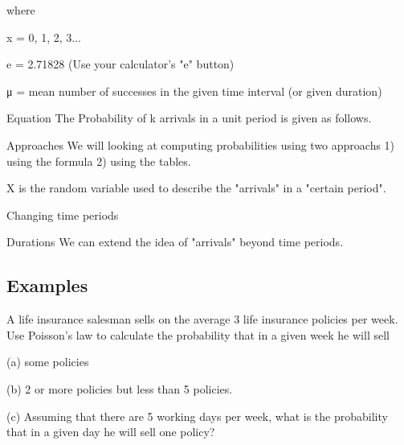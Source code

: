 where

x = 0, 1, 2, 3...

e = 2.71828 (Use your calculator's "e" button)

μ = mean number of successes in the given time interval (or given duration)

Equation 
The Probability of k arrivals in a unit period is given as follows.
 

Approaches
We will looking at computing probabilities using two approachs
1) using the formula
2) using the tables.
 
X is the random variable used to describe the "arrivals" in a "certain period".
 
 
Changing time periods
 
 
Durations
We can extend the idea of "arrivals" beyond time periods.
 
\subsection*{Examples}

A life insurance salesman sells on the average 3 life insurance policies per week. Use Poisson's law to calculate the probability that in a given week he will sell

(a) some policies

(b) 2 or more policies but less than 5 policies.

(c) Assuming that there are 5 working days per week, what is the probability that in a given day he will sell one policy?
